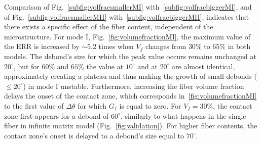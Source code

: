 \documentclass[review]{elsarticle}
\begin{document}
Comparison of Fig.~\ref{subfig:volfracsmallerMI} with~\ref{subfig:volfracbiggerMI}, and of Fig.~\ref{subfig:volfracsmallerMII} with~\ref{subfig:volfracbiggerMII}, indicates that there exists a specific effect of the fiber content, independent of the microstructure. For mode I, Fig.~\ref{fig:volumefractionMI}, the maximum value of the ERR is increased by $\sim 5.2$ times when $V_{f}$ changes from $30\%$ to $65\%$ in both models. The debond's size for which the peak value occurs remains unchanged at $20^{\circ}$, but for $60\%$ and $65\%$ the value at $10^{\circ}$ and at $20^{\circ}$ are almost identical, approximately creating a plateau and thus making the growth of small debonds ($\leq 20^{\circ}$) in mode I unstable. Furthermore, increasing the fiber volume fraction delays the onset of the contact zone, which corresponds in~\ref{fig:volumefractionMI} to the first value of $\Delta\theta$ for which $G_{I}$ is equal to zero. For $V_{f}=30\%$, the contact zone first appears for a debond of $60^{\circ}$, similarly to what happens in the single fiber in infinite matrix model (Fig.~\ref{fig:validation}). For higher fiber contents, the contact zone's onset is delayed to a debond's size equal to $70^{\circ}$.
\end{document}
